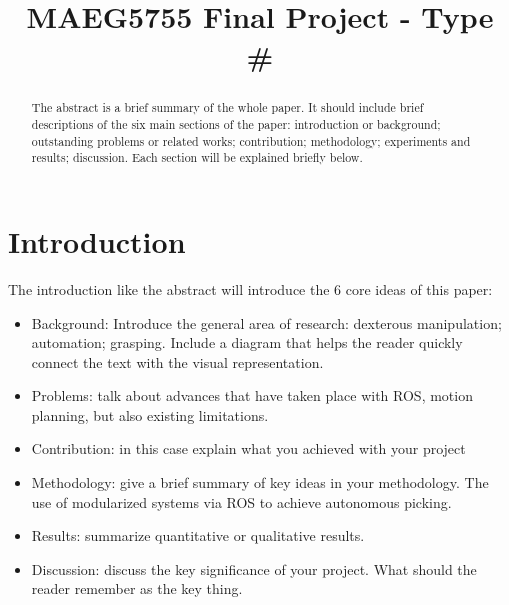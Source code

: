 \documentclass[conference]{IEEEtran}
\begin{document}
\title{MAEG5755 Final Project - Type \#}

\author{
\and
{}
}
\maketitle
\begin{abstract}
The abstract is a brief summary of the whole paper. It should include brief descriptions of the six main sections of the paper: introduction or background; outstanding problems or related works; contribution; methodology; experiments and results; discussion. Each section will be explained briefly below.
\end{abstract}
\section{Introduction}
The introduction like the abstract will introduce the 6 core ideas of this paper:
\begin{itemize}
    \item Background: Introduce the general area of research: dexterous manipulation; automation; grasping. Include a diagram that helps the reader quickly connect the text with the visual representation.
    \item Problems: talk about advances that have taken place with ROS, motion planning, but also existing limitations.
    \item Contribution: in this case explain what you achieved with your project
    \item Methodology: give a brief summary of key ideas in your methodology. The use of modularized systems via ROS to achieve autonomous picking.
    \item Results: summarize quantitative or qualitative results. 
    \item Discussion: discuss the key significance of your project. What should the reader remember as the key thing. 
\end{itemize}
\end{document}
